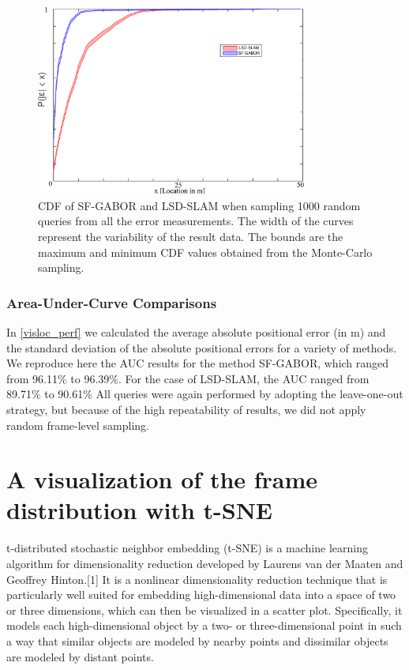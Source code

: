 \begin{figure}
\centering
\includegraphics[width=0.8\textwidth]{gfx/Chapter06/SF_GABORvsLSD_SLAM.pdf}
\caption{CDF of SF-GABOR and LSD-SLAM when sampling 1000 random queries from all the error measurements. The width of the curves represent the variability of the result data. The bounds are the maximum and minimum CDF values obtained from the Monte-Carlo sampling.}
\label{fig:cdf}
\end{figure}


\subsubsection{Area-Under-Curve Comparisons}
In \ref{visloc_perf} we calculated the average absolute positional error (in m) and the standard deviation of the absolute positional errors for a variety of methods. We reproduce here the AUC results for the method SF-GABOR, which ranged from 96.11\% to 96.39\%. For the case of LSD-SLAM, the AUC ranged from 89.71\% to 90.61\% All queries were again performed by adopting the leave-one-out strategy, but because of the high repeatability of results, we did not apply random frame-level sampling.  




\section{A visualization of the frame distribution with t-SNE}


t-distributed stochastic neighbor embedding (t-SNE) is a machine learning algorithm for dimensionality reduction developed by Laurens van der Maaten and Geoffrey Hinton.[1] It is a nonlinear dimensionality reduction technique that is particularly well suited for embedding high-dimensional data into a space of two or three dimensions, which can then be visualized in a scatter plot. Specifically, it models each high-dimensional object by a two- or three-dimensional point in such a way that similar objects are modeled by nearby points and dissimilar objects are modeled by distant points.

